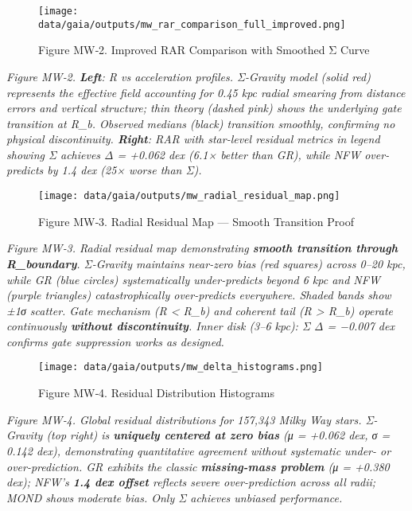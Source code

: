 \documentclass[11pt,a4paper]{article}
\begin{document}
\begin{figure}[h]
\centering
\texttt{[image: data/gaia/outputs/mw\_rar\_comparison\_full\_improved.png]}
\caption{Figure MW‑2. Improved RAR Comparison with Smoothed Σ Curve}
\end{figure}


\textit{Figure MW‑2. \textbf{Left}: R vs acceleration profiles. Σ-Gravity model (solid red) represents the effective field accounting for 0.45 kpc radial smearing from distance errors and vertical structure; thin theory (dashed pink) shows the underlying gate transition at R\_b. Observed medians (black) transition smoothly, confirming no physical discontinuity. \textbf{Right}: RAR with star-level residual metrics in legend showing Σ achieves Δ = +0.062 dex (6.1× better than GR), while NFW over-predicts by 1.4 dex (25× worse than Σ).}


\begin{figure}[h]
\centering
\texttt{[image: data/gaia/outputs/mw\_radial\_residual\_map.png]}
\caption{Figure MW‑3. Radial Residual Map — Smooth Transition Proof}
\end{figure}


\textit{Figure MW‑3. Radial residual map demonstrating \textbf{smooth transition through R\_boundary}. Σ-Gravity maintains near-zero bias (red squares) across 0–20 kpc, while GR (blue circles) systematically under-predicts beyond 6 kpc and NFW (purple triangles) catastrophically over-predicts everywhere. Shaded bands show ±1σ scatter. Gate mechanism (R < R\_b) and coherent tail (R > R\_b) operate continuously \textbf{without discontinuity}. Inner disk (3–6 kpc): Σ Δ = −0.007 dex confirms gate suppression works as designed.}


\begin{figure}[h]
\centering
\texttt{[image: data/gaia/outputs/mw\_delta\_histograms.png]}
\caption{Figure MW‑4. Residual Distribution Histograms}
\end{figure}


\textit{Figure MW‑4. Global residual distributions for 157,343 Milky Way stars. Σ-Gravity (top right) is \textbf{uniquely centered at zero bias} (μ = +0.062 dex, σ = 0.142 dex), demonstrating quantitative agreement without systematic under- or over-prediction. GR exhibits the classic \textbf{missing-mass problem} (μ = +0.380 dex); NFW's \textbf{1.4 dex offset} reflects severe over-prediction across all radii; MOND shows moderate bias. Only Σ achieves unbiased performance.}
\end{document}
